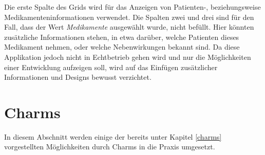 \documentclass[a4paper,bibtotoc,oneside]{scrbook}
\begin{document}
\newline
Die erste Spalte des Grids wird für das Anzeigen von Patienten-, beziehungsweise Medikamenteninformationen verwendet.
\newline
\newline
Die Spalten zwei und drei sind für den Fall, dass der Wert \textit{Medikamente} ausgewählt wurde, nicht befüllt. Hier könnten zusätzliche Informationen stehen, in etwa darüber, welche Patienten dieses Medikament nehmen, oder welche Nebenwirkungen bekannt sind. Da diese Applikation jedoch nicht in Echtbetrieb gehen wird und nur die Möglichkeiten einer Entwicklung aufzeigen soll, wird auf das Einfügen zusätzlicher Informationen und Designs bewusst verzichtet.

\section[Charms]{Charms}
In diesem Abschnitt werden einige der bereits unter Kapitel \ref{charms} vorgestellten Möglichkeiten durch Charms in die Praxis umgesetzt.
\end{document}
